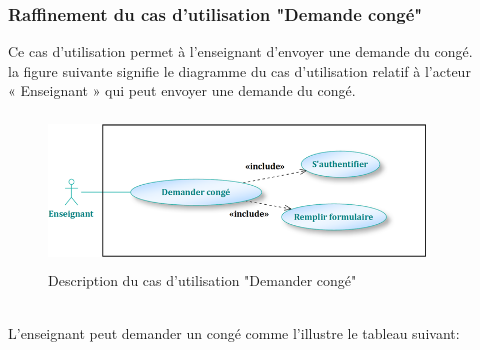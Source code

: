 \documentclass[12 pt ]{report}
\begin{document}
\subsubsection{Raffinement du cas d’utilisation "Demande congé"}
Ce cas d'utilisation permet à l'enseignant d'envoyer une demande du congé.\\

la figure suivante signifie le diagramme du cas d’utilisation  relatif à l’acteur \\« Enseignant » qui peut envoyer une demande du congé.
\begin{figure}[h]
\begin{center}
\includegraphics[width= 10cm , height = 4cm]{enseignant3.png}
\caption{Description du cas d'utilisation "Demander congé"}
\end{center}
\end{figure}
\\
L’enseignant peut demander un congé comme l’illustre le tableau suivant:
\end{document}
